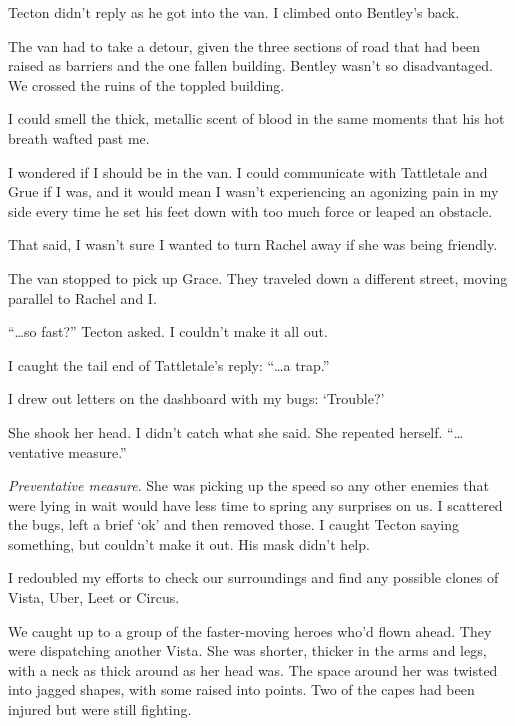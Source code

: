 Tecton didn't reply as he got into the van.  I climbed onto Bentley's back.



The van had to take a detour, given the three sections of road that had been raised as barriers and the one fallen building.  Bentley wasn't so disadvantaged.  We crossed the ruins of the toppled building.



I could smell the thick, metallic scent of blood in the same moments that his hot breath wafted past me.



I wondered if I should be in the van.  I could communicate with Tattletale and Grue if I was, and it would mean I wasn't experiencing an agonizing pain in my side every time he set his feet down with too much force or leaped an obstacle.



That said, I wasn't sure I wanted to turn Rachel away if she was being friendly.



The van stopped to pick up Grace.  They traveled down a different street, moving parallel to Rachel and I.



``\ldots{}so fast?'' Tecton asked.  I couldn't make it all out.



I caught the tail end of Tattletale's reply: ``\ldots a trap.''



I drew out letters on the dashboard with my bugs: `Trouble?'



She shook her head.  I didn't catch what she said.  She repeated herself.  ``\ldots{}ventative measure.''



\emph{Preventative measure}.  She was picking up the speed so any other enemies that were lying in wait would have less time to spring any surprises on us.  I scattered the bugs, left a brief `ok' and then removed those.  I caught Tecton saying something, but couldn't make it out.  His mask didn't help.



I redoubled my efforts to check our surroundings and find any possible clones of Vista, Uber, Leet or Circus.



We caught up to a group of the faster-moving heroes who'd flown ahead.  They were dispatching another Vista.  She was shorter, thicker in the arms and legs, with a neck as thick around as her head was.  The space around her was twisted into jagged shapes, with some raised into points.  Two of the capes had been injured but were still fighting.



